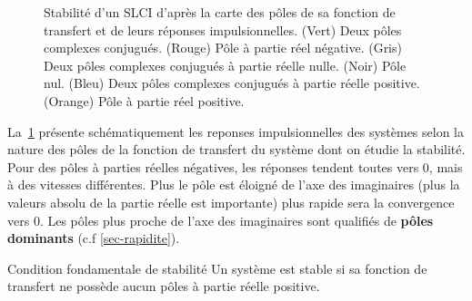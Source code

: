 \begin{landscape}
\centering
\captionsetup{width=1.10\linewidth}
\begin{figure}[!h]
    \centering
    
    \caption{Stabilité d'un SLCI d'après la carte des pôles de sa fonction de
             transfert et de leurs réponses impulsionnelles. 
             (Vert) Deux pôles complexes conjugués. 
             (Rouge) Pôle à partie réel négative. 
             (Gris) Deux pôles complexes conjugués à partie réelle nulle.
             (Noir) Pôle nul.
             (Bleu) Deux pôles complexes conjugués à partie réelle positive.
             (Orange) Pôle à partie réel positive.\label{fig-stab_imp_all}}
\end{figure}
\end{landscape}
\newpage
\pagestyle{fancy}
\captionsetup{width=\linewidth}
La~\cref{fig-stab_imp_all} présente schématiquement les reponses 
impulsionnelles des systèmes selon la nature des pôles de la fonction 
de transfert du système dont on étudie la stabilité. 
Pour des pôles à parties réelles négatives, les réponses tendent toutes vers 0, 
mais à des vitesses différentes. Plus le pôle est éloigné de l'axe des 
imaginaires (plus la valeurs absolu de la partie réelle est importante) 
plus rapide sera la convergence vers 0. Les pôles plus proche de l'axe des 
imaginaires sont qualifiés de \textbf{pôles dominants}
(c.f \cref{sec-rapidite}).
\begin{criteria}{Condition fondamentale de stabilité}
    Un système est stable si sa fonction de transfert ne possède aucun 
    pôles à partie réelle positive.
\end{criteria}

